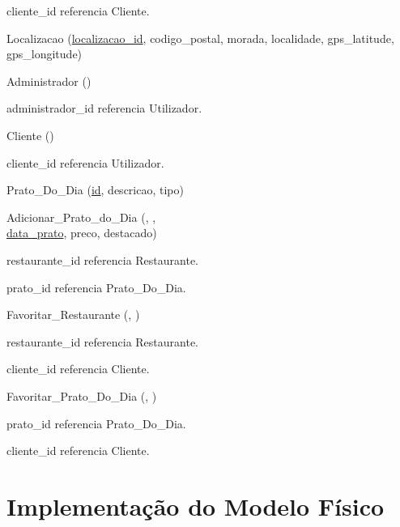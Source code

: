 \documentclass[a4paper,12pt]{report}
\begin{document}
\hspace*{1.5cm} cliente\_id referencia Cliente.

\medskip

Localizacao (\underline{localizacao\_id}, codigo\_postal, morada, localidade, gps\_latitude, gps\_longitude)

\medskip

Administrador (\underline{})

\hspace*{1.5cm} administrador\_id referencia Utilizador.

\medskip

Cliente (\underline{})

\hspace*{1.5cm} cliente\_id referencia Utilizador.

\medskip

Prato\_Do\_Dia (\underline{id}, descricao, tipo)

\medskip

Adicionar\_Prato\_do\_Dia (\underline{}, \underline{},\\ \underline{data\_prato}, preco, destacado)

\hspace*{1.5cm} restaurante\_id referencia Restaurante.

\hspace*{1.5cm} prato\_id referencia Prato\_Do\_Dia.

\medskip

Favoritar\_Restaurante (\underline{}, \underline{})

\hspace*{1.5cm} restaurante\_id referencia Restaurante.

\hspace*{1.5cm} cliente\_id referencia Cliente.

\medskip

Favoritar\_Prato\_Do\_Dia (\underline{}, \underline{})

\hspace*{1.5cm} prato\_id referencia Prato\_Do\_Dia.

\hspace*{1.5cm} cliente\_id referencia Cliente.



\chapter{Implementação do Modelo Físico}
\end{document}
